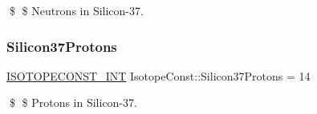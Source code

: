 \$ \$ Neutrons in Silicon-\/37. \mbox{\label{group___isotope_const-_silicon-_si37_ga2416bdca2fa3dddcbc864745a2773ec3}} 
\subsubsection{\texorpdfstring{Silicon37\+Protons}{Silicon37Protons}}
{\footnotesize\ttfamily \mbox{\hyperlink{group___isotope_const-_macros_ga5f18360b3e99483a35c32d789e62621c}{I\+S\+O\+T\+O\+P\+E\+C\+O\+N\+S\+T\+\_\+\+I\+NT}} Isotope\+Const\+::\+Silicon37\+Protons = 14}

\$ \$ Protons in Silicon-\/37. 